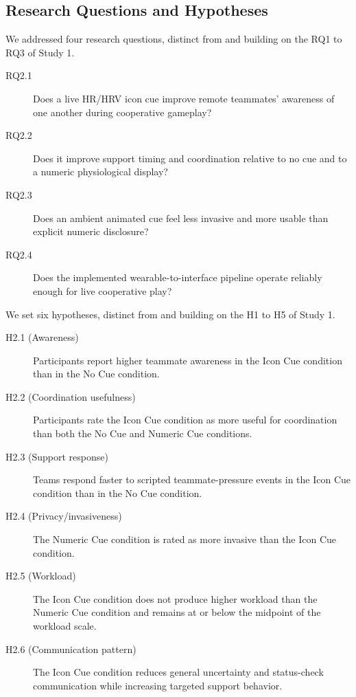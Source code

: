 \documentclass[manuscript,review,anonymous]{acmart}
\begin{document}
\subsection{Research Questions and Hypotheses}
We addressed four research questions, distinct from and building on the RQ1 to RQ3 of Study 1.
\begin{description}
    \item[RQ2.1] Does a live HR/HRV icon cue improve remote teammates' awareness of one another during cooperative gameplay?
    \item[RQ2.2] Does it improve support timing and coordination relative to no cue and to a numeric physiological display?
    \item[RQ2.3] Does an ambient animated cue feel less invasive and more usable than explicit numeric disclosure?
    \item[RQ2.4] Does the implemented wearable-to-interface pipeline operate reliably enough for live cooperative play?
\end{description}

We set six hypotheses, distinct from and building on the H1 to H5 of Study 1.
\begin{description}
    \item[H2.1 (Awareness)] Participants report higher teammate awareness in the Icon Cue condition than in the No Cue condition.
    \item[H2.2 (Coordination usefulness)] Participants rate the Icon Cue condition as more useful for coordination than both the No Cue and Numeric Cue conditions.
    \item[H2.3 (Support response)] Teams respond faster to scripted teammate-pressure events in the Icon Cue condition than in the No Cue condition.
    \item[H2.4 (Privacy/invasiveness)] The Numeric Cue condition is rated as more invasive than the Icon Cue condition.
    \item[H2.5 (Workload)] The Icon Cue condition does not produce higher workload than the Numeric Cue condition and remains at or below the midpoint of the workload scale.
    \item[H2.6 (Communication pattern)] The Icon Cue condition reduces general uncertainty and status-check communication while increasing targeted support behavior.
\end{description}
\end{document}

